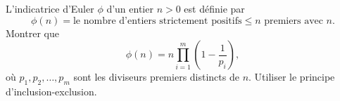 L'indicatrice d'Euler $\phi$ d'un entier $n > 0$ est définie par
\[ \phi(n) = \text{le nombre d'entiers strictement positifs} \leq n \text{ premiers avec } n. \]
Montrer que
\[ \phi(n) = n\prod_{i=1}^m \left(1 - \frac{1}{p_i}\right), \]
où $p_1, p_2, \ldots, p_m$ sont les diviseurs premiers distincts de $n$. Utiliser le principe d'inclusion-exclusion.
